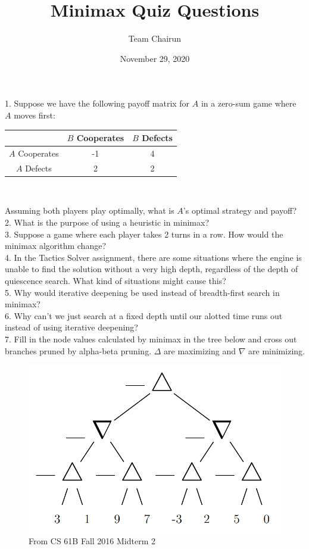 \documentclass[12pt, letterpaper]{article}
\title{Minimax Quiz Questions}
\author{Team Chairun}
\date{November 29, 2020}
\begin{document}
\maketitle

1. Suppose we have the following payoff matrix for $A$ in a zero-sum game where $A$ moves first: \\
\begin{table}[H]
\centering
\begin{tabular}{|c|c|c|}
    \hline
    & $B$ Cooperates & $B$ Defects \\
    \hline
    $A$ Cooperates & -1 & 4 \\
    \hline
    $A$ Defects & 2 & 2 \\
    \hline
\end{tabular} \\
\end{table}
Assuming both players play optimally, what is $A$'s optimal strategy and payoff? \\

2. What is the purpose of using a heuristic in minimax? \\

3. Suppose a game where each player takes 2 turns in a row. How would the minimax algorithm change? \\

4. In the Tactics Solver assignment, there are some situations where the engine is unable to find the solution without a very high depth, regardless of the depth of quiescence search. What kind of situations might cause this? \\

5. Why would iterative deepening be used instead of breadth-first search in minimax? \\

6. Why can't we just search at a fixed depth until our alotted time runs out instead of using iterative deepening? \\

7. Fill in the node values calculated by minimax in the tree below and cross out branches pruned by alpha-beta pruning. $\Delta$ are maximizing and $\nabla$ are minimizing.
\begin{figure}[H]
    \centering
    \includegraphics[scale=0.3]{minimax-prob.png}
    \caption*{From CS 61B Fall 2016 Midterm 2}
\end{figure}
\end{document}
